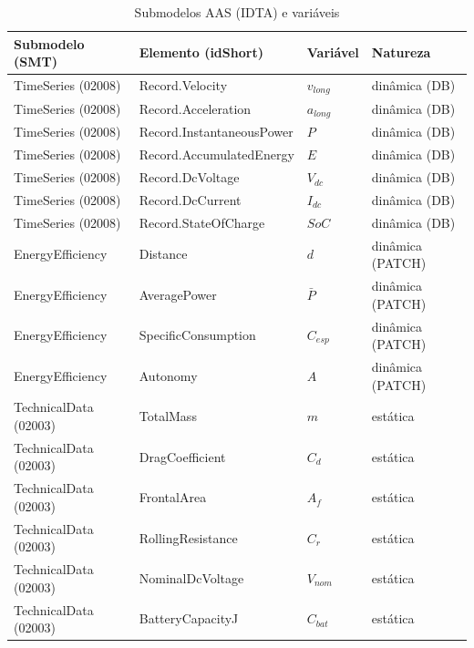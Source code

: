 \documentclass[12pt,a4paper]{report}
\begin{document}
\begin{table}[h]
\centering
\caption{Submodelos AAS (IDTA) e variáveis}
\label{tab:aas}
\begin{tabular}{@{}llll@{}}
\toprule
\textbf{Submodelo (SMT)} & \textbf{Elemento (idShort)} & \textbf{Variável} & \textbf{Natureza} \\
\midrule
TimeSeries (02008)       & Record.Velocity             & $v_{long}$   & dinâmica (DB)  \\
TimeSeries (02008)       & Record.Acceleration         & $a_{long}$   & dinâmica (DB)  \\
TimeSeries (02008)       & Record.InstantaneousPower   & $P$          & dinâmica (DB)  \\
TimeSeries (02008)       & Record.AccumulatedEnergy    & $E$          & dinâmica (DB)  \\
TimeSeries (02008)       & Record.DcVoltage            & $V_{dc}$     & dinâmica (DB)  \\
TimeSeries (02008)       & Record.DcCurrent            & $I_{dc}$     & dinâmica (DB)  \\
TimeSeries (02008)       & Record.StateOfCharge        & $SoC$        & dinâmica (DB)  \\
\midrule
EnergyEfficiency         & Distance                    & $d$          & dinâmica (PATCH) \\
EnergyEfficiency         & AveragePower                & $\bar{P}$    & dinâmica (PATCH) \\
EnergyEfficiency         & SpecificConsumption         & $C_{esp}$    & dinâmica (PATCH) \\
EnergyEfficiency         & Autonomy                    & $A$          & dinâmica (PATCH) \\
\midrule
TechnicalData (02003)    & TotalMass                   & $m$          & estática \\
TechnicalData (02003)    & DragCoefficient             & $C_d$        & estática \\
TechnicalData (02003)    & FrontalArea                 & $A_f$        & estática \\
TechnicalData (02003)    & RollingResistance           & $C_r$        & estática \\
TechnicalData (02003)    & NominalDcVoltage            & $V_{nom}$    & estática \\
TechnicalData (02003)    & BatteryCapacityJ            & $C_{bat}$    & estática \\
\bottomrule
\end{tabular}
\end{table}
\end{document}
